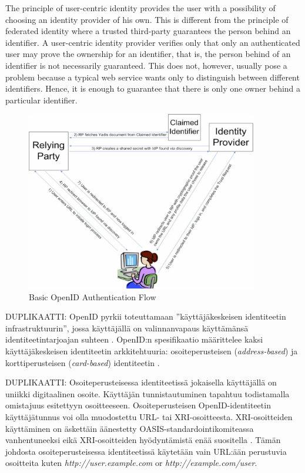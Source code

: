 \documentclass[english,gradu]{tktltiki}
\begin{document}
The principle of user-centric identity provides the user with a possibility of choosing an identity provider of his own. This is different from the principle of federated identity where a trusted third-party guarantees the person behind an identifier. A user-centric identity provider verifies only that only an authenticated user may prove the ownership for an identifier, that is, the person behind of an identifier is not necessarily guaranteed. This does not, however, usually pose a problem because a typical web service wants only to distinguish between different identifiers. Hence, it is enough to guarantee that there is only one owner behind a particular identifier.

     \begin{figure}
       \centering
       \includegraphics[width=0.9\textwidth]{images/openid_flow_recordon06.jpg}
       \caption{Basic OpenID Authentication Flow \cite{openid_2.0_platform_2009}}
       \label{fig:basic_openid_flow}
     \end{figure}


              DUPLIKAATTI:
OpenID pyrkii toteuttamaan ''käyttäjäkeskeisen identiteetin infrastruktuurin'', jossa käyttäjällä on valinnanvapaus käyttämänsä identiteetintarjoajan suhteen \cite{openid_2.0_platform_2009}. OpenID:n spesifikaatio määrittelee kaksi käyttäjäkeskeisen identiteetin arkkitehtuuria: osoiteperusteisen (\emph{address-based}) ja korttiperusteisen (\emph{card-based}) identiteetin \cite{openid_2.0_specification_07}.

              DUPLIKAATTI:
Osoiteperusteisessa identiteetissä jokaisella käyttäjällä on uniikki digitaalinen osoite. Käyttäjän tunnistautuminen tapahtuu todistamalla omistajuus esitettyyn osoitteeseen. Osoiteperusteisen OpenID-identiteetin käyttäjätunnus voi olla muodostettu URL- tai XRI-osoitteesta. XRI-osoitteiden käyttäminen on äskettäin äänestetty OASIS-standardointikomiteassa vanhentuneeksi eikä XRI-osoitteiden hyödyntämistä enää suositella \cite{xri_depcrecated_08a, xri_depcrecated_08b, xri_depcrecated_08c, xri_depcrecated_08d}. Tämän johdosta osoiteperusteisessa identiteetissä käytetään vain URL:ään perustuvia osoitteita kuten \emph{http://user.example.com} or \emph{http://example.com/user}.
\end{document}
